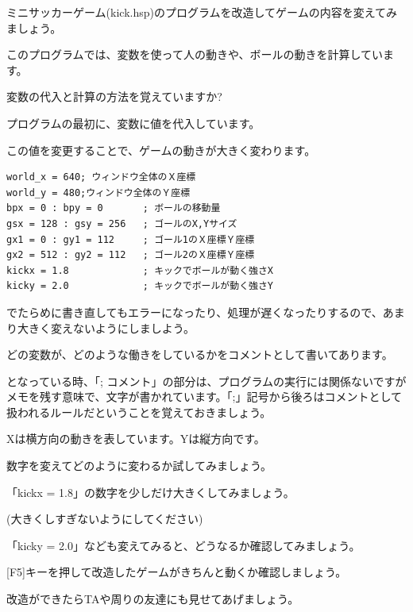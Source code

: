 \documentclass[text04.tex]{subfiles}
\begin{document}
ミニサッカーゲーム(kick.hsp)のプログラムを改造してゲームの内容を変えてみましょう。

このプログラムでは、変数を使って人の動きや、ボールの動きを計算しています。

変数の代入と計算の方法を覚えていますか?



プログラムの最初に、変数に値を代入しています。

この値を変更することで、ゲームの動きが大きく変わります。


\begin{lstlisting}[firstnumber=3,caption=ミニサッカーゲームのプログラムの一部]
world_x = 640; ウィンドウ全体のＸ座標
world_y = 480;ウィンドウ全体のＹ座標
bpx = 0 : bpy = 0       ; ボールの移動量
gsx = 128 : gsy = 256   ; ゴールのX,Yサイズ
gx1 = 0 : gy1 = 112     ; ゴール1のＸ座標Ｙ座標
gx2 = 512 : gy2 = 112   ; ゴール2のＸ座標Ｙ座標
kickx = 1.8             ; キックでボールが動く強さX
kicky = 2.0             ; キックでボールが動く強さY
\end{lstlisting}


でたらめに書き直してもエラーになったり、処理が遅くなったりするので、あまり大きく変えないようにしましよう。

どの変数が、どのような働きをしているかをコメントとして書いてあります。



となっている時、「; コメント」の部分は、プログラムの実行には関係ないですがメモを残す意味で、文字が書かれています。「;」記号から後ろはコメントとして扱われるルールだということを覚えておきましょう。

Xは横方向の動きを表しています。Yは縦方向です。

数字を変えてどのように変わるか試してみましょう。


\exampleanswer



「kickx = 1.8」の数字を少しだけ大きくしてみましょう。

(大きくしすぎないようにしてください)

「kicky = 2.0」なども変えてみると、どうなるか確認してみましょう。



[F5]キーを押して改造したゲームがきちんと動くか確認しましょう。

改造ができたらTAや周りの友達にも見せてあげましょう。
\end{document}
